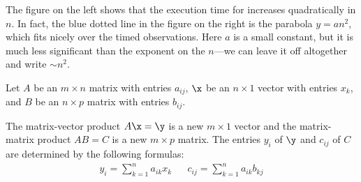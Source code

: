 The figure on the left shows that the execution time for  increases quadratically in $n$.
In fact, the blue dotted line in the figure on the right is the parabola $y = an^2$, which fits nicely over the timed observations. Here $a$ is a small constant, but it is much less significant than the exponent on the $n$---we can leave it off altogether and write  $\sim n^2$.%


\begin{problem} %
Let $A$ be an $m \times n$ matrix with entries $a_{ij}$, $\x$ be an $n \times 1$ vector with entries $x_k$, and $B$ be an $n \times p$ matrix with entries $b_{ij}$.
%

The matrix-vector product $A\x = \y$ is a new $m \times 1$ vector and the matrix-matrix product $AB = C$ is a new $m \times p$ matrix.
The entries $y_i$ of $\y$ and $c_{ij}$ of $C$ are determined by the following formulas:
%
\begin{align*}
y_i = \sum_{k=1}^n a_{ik}x_k%
&&
c_{ij} = \sum_{k=1}^n a_{ik}b_{kj}%
\end{align*}


\end{problem}
